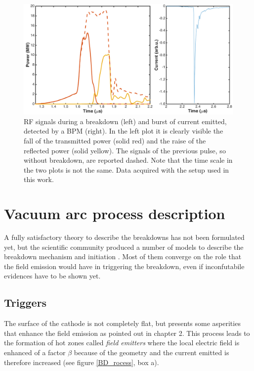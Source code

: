 \begin{figure}[h]
\centering
\includegraphics[scale=0.33]{pictures/RFandBPM.png}
\caption{RF signals during a breakdown (left) and burst of current emitted, detected by a BPM (right). In the left plot it is clearly visible the fall of the transmitted power (solid red) and the raise of the reflected power (solid yellow). The signals of the previous pulse, so without breakdown, are reported dashed. Note that the time scale in the two plots is not the same. Data acquired with the setup used in this work.}
\label{RFandBPM}
\end{figure}



\section[Vacuum arc process description]{Vacuum arc process description}

A fully satisfactory theory to describe the breakdowns has not been formulated yet, but the scientific community produced a number of models to describe the breakdown mechanism and initiation \cite{davies:triggers}. Most of them converge on the role that the field emission would have in triggering the breakdown, even if inconfutabile evidences have to be shown yet.

\subsection[Triggers]{Triggers}

The surface of the cathode is not completely flat, but presents some asperities that enhance the field emission as pointed out in chapter 2. This process leads to the formation of hot zones called \textit{field emitters} where the local electric field is enhanced of a factor $\beta$ because of the geometry and the current emitted is therefore increased (see figure \ref{BD_rocess}, box a). 

